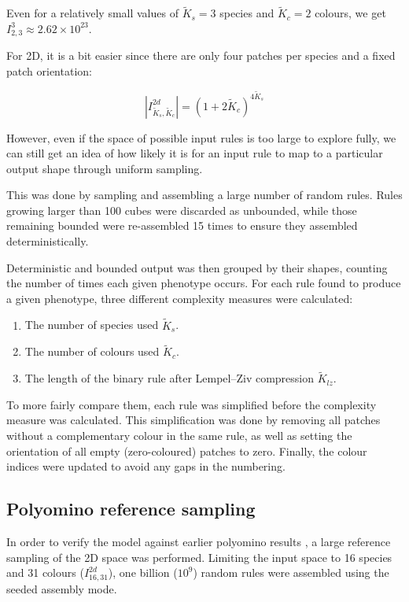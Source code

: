 Even for a relatively small values of \(\widetilde{K}_s=3\) species and \(\widetilde{K}_c=2\) colours, we get \(I_{2, 3}^3 \approx 2.62 \times 10^{23}\).

For 2D, it is a bit easier since there are only four patches per species and a fixed patch orientation:

\[
\left\lvert I_{\widetilde{K}_s, \widetilde{K}_c}^{2d}\right\rvert = (1+2\widetilde{K}_c)^{4\widetilde{K}_s}
\]

However, even if the space of possible input rules is too large to explore fully, we can still get an idea of how likely it is for an input rule to map to a particular output shape through uniform sampling.

This was done by sampling and assembling a large number of random rules. Rules growing larger than 100 cubes were discarded as unbounded, while those remaining bounded were re-assembled 15 times to ensure they assembled deterministically. 

Deterministic and bounded output was then grouped by their shapes, counting the number of times each given phenotype occurs. For each rule found to produce a given phenotype, three different complexity measures were calculated:
\begin{enumerate}
    \item The number of species used \(\widetilde{K}_s\).
    \item The number of colours used \(\widetilde{K}_c\).
    \item The length of the binary rule after Lempel–Ziv compression \cite{lempel-ziv} \(\widetilde{K}_{lz}\). 
\end{enumerate}

To more fairly compare them, each rule was simplified before the complexity measure was calculated. This simplification was done by removing all patches without a complementary colour in the same rule, as well as setting the orientation of all empty (zero-coloured) patches to zero. Finally, the colour indices were updated to avoid any gaps in the numbering.

\subsection{Polyomino reference sampling}
\label{sec:refcalc}
In order to verify the model against earlier polyomino results \cite{johnston2021}, a large reference sampling of the 2D space was performed. Limiting the input space to 16 species and 31 colours (\(I_{16,31}^{2d}\)), one billion (\(10^9\)) random rules were assembled using the seeded assembly mode.

